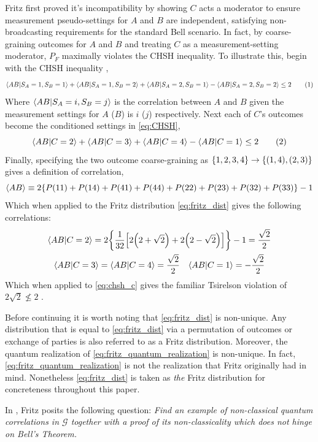 \documentclass[aps, 10pt, english, twoside, pra, nofootinbib, longbibliography]{revtex4-1}
\theoremstyle{plain}
\theoremstyle{definition}
\theoremstyle{remark}
\newcommand{\graph}{\mathcal{G}}
\newcommand{\ts}{{\graph}}
\begin{document}
    Fritz first proved it's incompatibility \cite{Fritz_2012} by showing $C$ acts a moderator to ensure measurement pseudo-settings for $A$ and $B$ are independent, satisfying non-broadcasting requirements for the standard Bell scenario. In fact, by coarse-graining outcomes for $A$ and $B$ and treating $C$ as a measurement-setting moderator, $P_F$ maximally violates the CHSH inequality. To illustrate this, begin with the CHSH inequality \cite{CHSH_Original},
    \[ \ba{AB|S_A=1, S_B=1} + \ba{AB|S_A=1, S_B=2} + \ba{AB|S_A=2, S_B=1} - \ba{AB|S_A=2, S_B=2} \leq 2 \eq \label{eq:CHSH}\]
    Where $\ba{AB|S_A=i, S_B=j}$ is the correlation between $A$ and $B$ given the measurement settings for $A$ ($B$) is $i$ ($j$) respectively. Next each of $C$'s outcomes become the conditioned settings in \cref{eq:CHSH},
    \[ \ba{AB|C=2} + \ba{AB|C=3} + \ba{AB|C=4} - \ba{AB|C=1} \leq 2 \eq \label{eq:chsh_c}\]
    Finally, specifying the two outcome coarse-graining as $\bc{1,2,3,4} \rightarrow \bc{\br{1,4}, \br{2,3}}$ gives a definition of correlation,
    \[ \ba{AB} \defined 2\bc{\prob[][11] + \prob[][14] + \prob[][41] + \prob[][44] + \prob[][22] + \prob[][23] + \prob[][32] + \prob[][33]} - 1 \]
    Which when applied to the Fritz distribution \cref{eq:fritz_dist} gives the following correlations:
    \begin{gather*}
    \ba{AB|C=2} = 2 \bc{\f{1}{32}\bs{2\br{2+\sqrt{2}}+2\br{2-\sqrt{2}}}} - 1 = \f{\sqrt{2}}{2} \\
    \ba{AB|C=3} = \ba{AB|C=4} = \f{\sqrt{2}}{2} \quad \ba{AB|C=1} = -\f{\sqrt{2}}{2}
    \end{gather*}
    Which when applied to \cref{eq:chsh_c} gives the familiar Tsirelson violation of $2\sqrt{2} \not\leq 2$ \cite{Cirelson_1980}.

    Before continuing it is worth noting that \cref{eq:fritz_dist} is non-unique. Any distribution that is equal to \cref{eq:fritz_dist} via a permutation of outcomes or exchange of parties is also referred to as a Fritz distribution. Moreover, the quantum realization of \cref{eq:fritz_quantum_realization} is non-unique. In fact, \cref{eq:fritz_quantum_realization} is not the realization that Fritz originally had in mind. Nonetheless \cref{eq:fritz_dist} is taken as \textit{the} Fritz distribution for concreteness throughout this paper.

    In \cite{Fritz_2012}, Fritz posits the following question: \textit{Find an example of non-classical quantum correlations in $\ts$ together with a proof of its non-classicality which does not hinge on Bell’s Theorem.}
\end{document}
